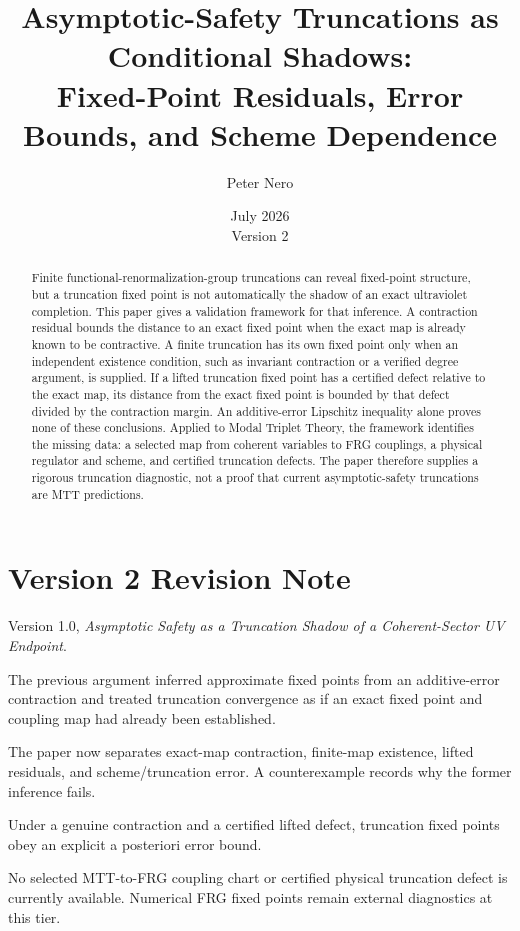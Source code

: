 \documentclass[11pt]{article}
\title{Asymptotic-Safety Truncations as Conditional Shadows:\\
\large Fixed-Point Residuals, Error Bounds, and Scheme Dependence}
\author{Peter Nero}
\date{July 2026\\Version 2}
\theoremstyle{definition}
\theoremstyle{remark}
\begin{document}
\maketitle

\begin{abstract}
Finite functional-renormalization-group truncations can reveal fixed-point
structure, but a truncation fixed point is not automatically the shadow of an
exact ultraviolet completion. This paper gives a validation framework for
that inference. A contraction residual bounds the distance to an exact fixed
point when the exact map is already known to be contractive. A finite
truncation has its own fixed point only when an independent existence
condition, such as invariant contraction or a verified degree argument, is
supplied. If a lifted truncation fixed point has a certified defect relative
to the exact map, its distance from the exact fixed point is bounded by that
defect divided by the contraction margin. An additive-error Lipschitz
inequality alone proves none of these conclusions. Applied to Modal Triplet
Theory, the framework identifies the missing data: a selected map from
coherent variables to FRG couplings, a physical regulator and scheme, and
certified truncation defects. The paper therefore supplies a rigorous
truncation diagnostic, not a proof that current asymptotic-safety
truncations are MTT predictions.
\end{abstract}

\section*{Version 2 Revision Note}
\begin{description}[leftmargin=3.2cm,style=nextline]
\item[Supersedes] Version 1.0, \emph{Asymptotic Safety as a Truncation
Shadow of a Coherent-Sector UV Endpoint}.
\item[Reason] The previous argument inferred approximate fixed points from
an additive-error contraction and treated truncation convergence as if an
exact fixed point and coupling map had already been established.
\item[Resolution] The paper now separates exact-map contraction, finite-map
existence, lifted residuals, and scheme/truncation error. A counterexample
records why the former inference fails.
\item[Retained result] Under a genuine contraction and a certified lifted
defect, truncation fixed points obey an explicit a posteriori error bound.
\item[Remaining boundary] No selected MTT-to-FRG coupling chart or certified
physical truncation defect is currently available. Numerical FRG fixed
points remain external diagnostics at this tier.
\end{description}
\end{document}

